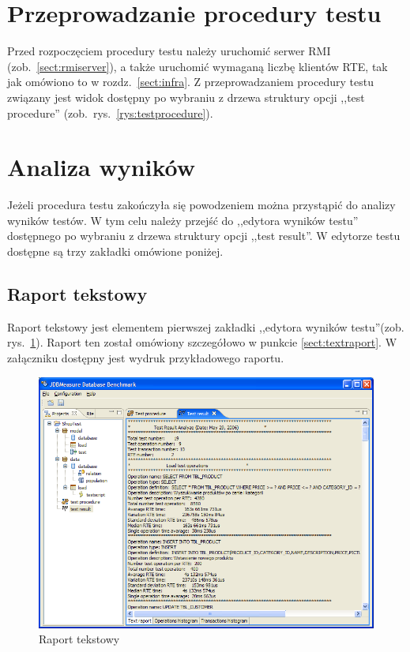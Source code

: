 \section{Przeprowadzanie procedury testu}
Przed rozpoczęciem procedury testu należy uruchomić serwer RMI (zob.~\ref{sect:rmiserver}),
a także uruchomić wymaganą liczbę klientów RTE, tak jak omówiono to w rozdz.~\ref{sect:infra}. 
Z przeprowadzaniem procedury testu związany jest widok dostępny po wybraniu z drzewa struktury 
opcji ,,test procedure'' (zob.~rys.~\ref{rys:testprocedure}).

\section{Analiza wyników}
Jeżeli procedura testu zakończyła się powodzeniem można przystąpić do analizy wyników
testów. W tym celu należy przejść do ,,edytora wyników testu'' dostępnego po wybraniu z
drzewa struktury opcji ,,test result''. W edytorze testu dostępne są trzy zakładki
omówione poniżej.

\subsection{Raport tekstowy}
Raport tekstowy jest elementem pierwszej zakładki ,,edytora wyników testu''(zob. rys.~\ref{rys:textraport}). Raport ten został
omówiony szczegółowo w punkcie \ref{sect:textraport}. W załączniku dostępny
jest wydruk przykładowego raportu.
\begin{figure}[h]
\begin{center}
\includegraphics[width=0.9\linewidth]{figures/gui/30.png}
\end{center}
\caption{Raport tekstowy}\label{rys:textraport}
\end{figure}

